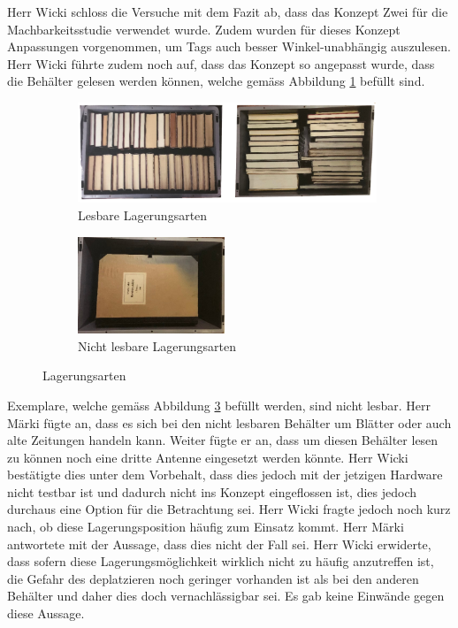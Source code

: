 \documentclass[parskip=full, a4paper]{scrreprt}
\begin{document}
Herr Wicki schloss die Versuche mit dem Fazit ab, dass das Konzept Zwei für die Machbarkeitsstudie verwendet wurde. Zudem wurden für dieses Konzept Anpassungen vorgenommen, um Tags auch besser Winkel-unabhängig auszulesen. Herr Wicki führte zudem noch auf, dass das Konzept so angepasst wurde, dass die Behälter gelesen werden können, welche gemäss Abbildung \ref{fig:behaelterFuellung} befüllt sind.
\begin{figure}[htb]
	\begin{subfigure}{.6\linewidth}
		\centering
		\includegraphics[keepaspectratio,height=3cm]{img/LagerungExemplare}
		\caption{Lesbare Lagerungsarten}
		\label{fig:behaelterFuellung}
	\end{subfigure}
	\begin{subfigure}{.4\linewidth}
		\centering
		\includegraphics[keepaspectratio,height=2.9cm]{img/LagerungExemplareNichtLesbar}
		\caption{Nicht lesbare Lagerungsarten}
		\label{fig:behaelterFuellungNichtLesbar}
	\end{subfigure}
	\caption{Lagerungsarten}
\end{figure}
Exemplare, welche gemäss Abbildung \ref{fig:behaelterFuellungNichtLesbar} befüllt werden, sind nicht lesbar. Herr Märki fügte an, dass es sich bei den nicht lesbaren Behälter um Blätter oder auch alte Zeitungen handeln kann. Weiter fügte er an, dass um diesen Behälter lesen zu können noch eine dritte Antenne eingesetzt werden könnte. Herr Wicki bestätigte dies unter dem Vorbehalt, dass dies jedoch mit der jetzigen Hardware nicht testbar ist und dadurch nicht ins Konzept eingeflossen ist, dies jedoch durchaus eine Option für die Betrachtung sei. Herr Wicki fragte jedoch noch kurz nach, ob diese Lagerungsposition häufig zum Einsatz kommt. Herr Märki antwortete mit der Aussage, dass dies nicht der Fall sei. Herr Wicki erwiderte, dass sofern diese Lagerungsmöglichkeit wirklich nicht zu häufig anzutreffen ist, die Gefahr des deplatzieren noch geringer vorhanden ist als bei den anderen Behälter und daher dies doch vernachlässigbar sei. Es gab keine Einwände gegen diese Aussage.
\end{document}
